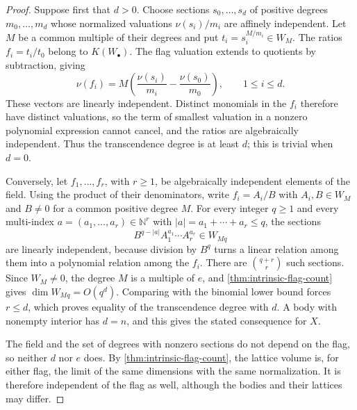 \begin{proof}
Suppose first that $d>0$. Choose sections $s_0,\ldots,s_d$ of positive degrees $m_0,\ldots,m_d$ whose normalized valuations $\nu(s_i)/m_i$ are affinely independent. Let $M$ be a common multiple of their degrees and put $t_i=s_i^{M/m_i}\in W_M$. The ratios $f_i=t_i/t_0$ belong to $K(W_\bullet)$. The flag valuation extends to quotients by subtraction, giving
\[
 \nu(f_i)=M\left(\frac{\nu(s_i)}{m_i}
                  -\frac{\nu(s_0)}{m_0}\right),
 \qquad 1\leq i\leq d.
\]
These vectors are linearly independent. Distinct monomials in the $f_i$ therefore have distinct valuations, so the term of smallest valuation in a nonzero polynomial expression cannot cancel, and the ratios are algebraically independent. Thus the transcendence degree is at least $d$; this is trivial when $d=0$.

Conversely, let $f_1,\ldots,f_r$, with $r\geq1$, be algebraically independent elements of the field. Using the product of their denominators, write $f_i=A_i/B$ with $A_i,B\in W_M$ and $B\neq0$ for a common positive degree $M$. For every integer $q\geq1$ and every multi-index $a=(a_1,\ldots,a_r)\in\mathbb N^r$ with $|a|=a_1+\cdots+a_r\leq q$, the sections
\[
 B^{q-|a|}A_1^{a_1}\cdots A_r^{a_r}\in W_{Mq}
\]
are linearly independent, because division by $B^q$ turns a linear relation among them into a polynomial relation among the $f_i$. There are $\binom{q+r}{r}$ such sections. Since $W_M\neq0$, the degree $M$ is a multiple of $e$, and \cref{thm:intrinsic-flag-count} gives $\dim W_{Mq}=O(q^d)$. Comparing with the binomial lower bound forces $r\leq d$, which proves equality of the transcendence degree with $d$. A body with nonempty interior has $d=n$, and this gives the stated consequence for $X$.

The field and the set of degrees with nonzero sections do not depend on the flag, so neither $d$ nor $e$ does. By \cref{thm:intrinsic-flag-count}, the lattice volume is, for either flag, the limit of the same dimensions with the same normalization. It is therefore independent of the flag as well, although the bodies and their lattices may differ.
\end{proof}
